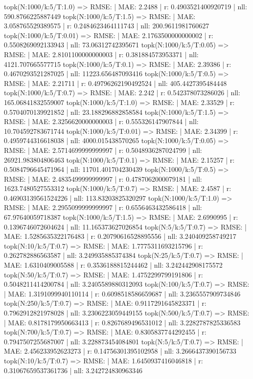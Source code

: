 topk(N:1000/k:5/T:1.0) => RMSE: | MAE: 2.2488 | r: 0.4903521400920719 | nll: 590.8766225887449
topk(N:1000/k:5/T:1.5) => RMSE: | MAE: 3.058765529389575 | r: 0.2484623464111743 | nll: 200.9611981760627
topk(N:1000/k:5/T:0.01) => RMSE: | MAE: 2.1763500000000002 | r: 0.5508269092133943 | nll: 73.06312742395671
topk(N:1000/k:5/T:0.05) => RMSE: | MAE: 2.8101100000000003 | r: 0.381884573953371 | nll: 4121.707665577715
topk(N:1000/k:5/T:0.1) => RMSE: | MAE: 2.39386 | r: 0.4670293521287025 | nll: 11223.656487093416
topk(N:1000/k:5/T:0.5) => RMSE: | MAE: 2.21711 | r: 0.49796262190492524 | nll: 405.4427395484448
topk(N:1000/k:5/T:0.7) => RMSE: | MAE: 2.242 | r: 0.542378073286026 | nll: 165.06841832559007
topk(N:1000/k:5/T:1.0) => RMSE: | MAE: 2.33529 | r: 0.5704070139921852 | nll: 23.188296882858584
topk(N:1000/k:5/T:1.5) => RMSE: | MAE: 2.3256620000000003 | r: 0.555326147907844 | nll: 10.704592783671744
topk(N:1000/k:5/T:0.01) => RMSE: | MAE: 2.34399 | r: 0.4959744316618038 | nll: 4000.015438570265
topk(N:1000/k:5/T:0.05) => RMSE: | MAE: 2.5714699999999997 | r: 0.5048936287024799 | nll: 26921.983804806463
topk(N:1000/k:5/T:0.1) => RMSE: | MAE: 2.15257 | r: 0.5084796645471964 | nll: 11701.401704230439
topk(N:1000/k:5/T:0.5) => RMSE: | MAE: 2.4835499999999997 | r: 0.4787062000079181 | nll: 1623.7480527553312
topk(N:1000/k:5/T:0.7) => RMSE: | MAE: 2.4587 | r: 0.46903139561524226 | nll: 113.83203825320297
topk(N:1000/k:5/T:1.0) => RMSE: | MAE: 2.2955099999999997 | r: 0.6556463432586418 | nll: 67.97640059718387
topk(N:1000/k:5/T:1.5) => RMSE: | MAE: 2.6990995 | r: 0.1396746072604624 | nll: 11.165373627026854
topk(N:5/k:5/T:0.7) => RMSE: | MAE: 1.5285635322176483 | r: 0.20790616528895556 | nll: 3.240409258749217
topk(N:10/k:5/T:0.7) => RMSE: | MAE: 1.7775311693215796 | r: 0.262782886563587 | nll: 3.249935885374384
topk(N:25/k:5/T:0.7) => RMSE: | MAE: 1.6310409005588 | r: 0.3536188815244462 | nll: 3.242442908175572
topk(N:50/k:5/T:0.7) => RMSE: | MAE: 1.4752299799191806 | r: 0.5048211414200784 | nll: 3.2405589880312093
topk(N:100/k:5/T:0.7) => RMSE: | MAE: 1.3191099940110114 | r: 0.6098518586659687 | nll: 3.2365557909734846
topk(N:250/k:5/T:0.7) => RMSE: | MAE: 0.9117291645823371 | r: 0.7962912821978028 | nll: 3.2306223059449155
topk(N:500/k:5/T:0.7) => RMSE: | MAE: 0.8178179950663413 | r: 0.8267689496531012 | nll: 3.2282787825336583
topk(N:700/k:5/T:0.7) => RMSE: | MAE: 0.8305837744292455 | r: 0.7947507255687007 | nll: 3.228873454084801
topk(N:5/k:5/T:0.7) => RMSE: | MAE: 2.456233952623273 | r: 0.14756301395102958 | nll: 3.2666437390156733
topk(N:10/k:5/T:0.7) => RMSE: | MAE: 1.6450937416046818 | r: 0.31067659537361736 | nll: 3.242724830963346
